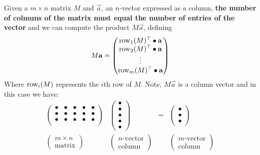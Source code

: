 \documentclass{ximera}
\begin{document}
Given a $m\times n$ matrix $M$ and $\vec{a}$, an $n$-vector expressed
as a column, \textbf{the number of colmuns of the matrix must equal
  the number of entries of the vector} and we can compute the product
$M\vec{a}$, defining
\[
M \mathbf{a} =
\begin{pmatrix}
  \operatorname{row}_1(M)^\top \bullet \mathbf{a} \\
  \operatorname{row}_2(M)^\top \bullet \mathbf{a} \\
  \vdots \\
  \operatorname{row}_m(M)^\top \bullet \mathbf{a}
\end{pmatrix}
\]
Where $\operatorname{row}_i(M)$ represents the $i$th row of $M$. Note, $M\vec{a}$ is
a column vector and in this case we have:
\[
\begin{matrix}
\begin{pmatrix}
  \bullet & \bullet & \bullet & \bullet & \bullet \\
  \bullet & \bullet & \bullet & \bullet & \bullet \\
  \bullet & \bullet & \bullet & \bullet & \bullet \\
\end{pmatrix}
&
\begin{pmatrix}
  \bullet \\ \bullet \\ \bullet \\ \bullet \\ \bullet
\end{pmatrix}
& = &
\begin{pmatrix}
  \bullet \\ \bullet \\ \bullet
\end{pmatrix}
\\
\begin{pmatrix}
  m\times n\\
  \text{matrix}
\end{pmatrix}
&
\begin{pmatrix}
  n\text{-vector}\\
  \text{column}
\end{pmatrix}
& &
\begin{pmatrix}
  m\text{-vector}\\
  \text{column}
\end{pmatrix}
\end{matrix}
\]
\end{document}

